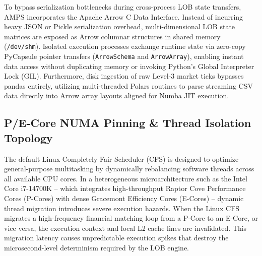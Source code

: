 To bypass serialization bottlenecks during cross-process LOB state transfers, AMPS incorporates the Apache Arrow C Data Interface. Instead of incurring heavy JSON or Pickle serialization overhead, multi-dimensional LOB state matrices are exposed as Arrow columnar structures in shared memory (\texttt{/dev/shm}). Isolated execution processes exchange runtime state via zero-copy PyCapsule pointer transfers (\texttt{ArrowSchema} and \texttt{ArrowArray}), enabling instant data access without duplicating memory or invoking Python's Global Interpreter Lock (GIL). Furthermore, disk ingestion of raw Level-3 market ticks bypasses pandas entirely, utilizing multi-threaded Polars routines to parse streaming CSV data directly into Arrow array layouts aligned for Numba JIT execution.

\subsection{P/E-Core NUMA Pinning \& Thread Isolation Topology}

The default Linux Completely Fair Scheduler (CFS) is designed to optimize general-purpose multitasking by dynamically rebalancing software threads across all available CPU cores. In a heterogeneous microarchitecture such as the Intel Core i7-14700K -- which integrates high-throughput Raptor Cove Performance Cores (P-Cores) with dense Gracemont Efficiency Cores (E-Cores) \cite{intel2024optimization} -- dynamic thread migration introduces severe execution hazards. When the Linux CFS migrates a high-frequency financial matching loop from a P-Core to an E-Core, or vice versa, the execution context and local L2 cache lines are invalidated. This migration latency causes unpredictable execution spikes that destroy the microsecond-level determinism required by the LOB engine.

